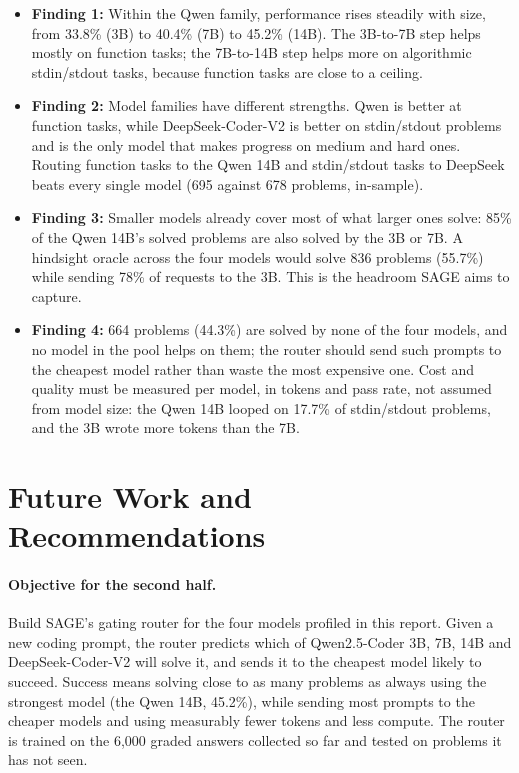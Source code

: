 \begin{itemize}[leftmargin=*]
  \item \textbf{Finding 1:} Within the Qwen family, performance rises steadily with size, from 33.8\% (3B) to 40.4\% (7B) to 45.2\% (14B). The 3B-to-7B step helps mostly on function tasks; the 7B-to-14B step helps more on algorithmic stdin/stdout tasks, because function tasks are close to a ceiling.
  \item \textbf{Finding 2:} Model families have different strengths. Qwen is better at function tasks, while DeepSeek-Coder-V2 is better on stdin/stdout problems and is the only model that makes progress on medium and hard ones. Routing function tasks to the Qwen 14B and stdin/stdout tasks to DeepSeek beats every single model (695 against 678 problems, in-sample).
  \item \textbf{Finding 3:} Smaller models already cover most of what larger ones solve: 85\% of the Qwen 14B's solved problems are also solved by the 3B or 7B. A hindsight oracle across the four models would solve 836 problems (55.7\%) while sending 78\% of requests to the 3B. This is the headroom SAGE aims to capture.
  \item \textbf{Finding 4:} 664 problems (44.3\%) are solved by none of the four models, and no model in the pool helps on them; the router should send such prompts to the cheapest model rather than waste the most expensive one. Cost and quality must be measured per model, in tokens and pass rate, not assumed from model size: the Qwen 14B looped on 17.7\% of stdin/stdout problems, and the 3B wrote more tokens than the 7B.
\end{itemize}

\section{Future Work and Recommendations}
\label{sec:future}

\paragraph{Objective for the second half.} Build SAGE's gating router for the four models profiled in this report. Given a new coding prompt, the router predicts which of Qwen2.5-Coder 3B, 7B, 14B and DeepSeek-Coder-V2 will solve it, and sends it to the cheapest model likely to succeed. Success means solving close to as many problems as always using the strongest model (the Qwen 14B, 45.2\%), while sending most prompts to the cheaper models and using measurably fewer tokens and less compute. The router is trained on the 6,000 graded answers collected so far and tested on problems it has not seen.

